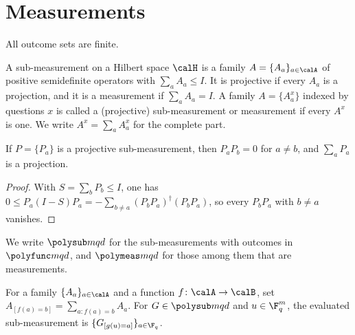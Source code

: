 \section{Measurements}

All outcome sets are finite.

\begin{definition}\label{def:measurements}
	\leanok
	A sub-measurement on a Hilbert space $\calH$ is a family
	$A=\{A_a\}_{a\in\calA}$ of positive semidefinite operators with
	$\sum_aA_a\le I$.  It is projective if every $A_a$ is a projection, and it
	is a measurement if $\sum_aA_a=I$.  A family $A=\{A^x_a\}$ indexed by
	questions $x$ is called a (projective) sub-measurement or measurement if
	every $A^x$ is one.  We write $A^x=\sum_aA^x_a$ for the complete part.
\end{definition}

\begin{proposition}\label{prop:projective-submeasurement-orthogonal}
	\leanok
	If $P=\{P_a\}$ is a projective sub-measurement, then $P_aP_b=0$ for
	$a\ne b$, and $\sum_aP_a$ is a projection.
\end{proposition}
\begin{proof}
	\leanok
	With $S=\sum_bP_b\le I$, one has
	$0\le P_a(I-S)P_a=-\sum_{b\ne a}(P_bP_a)^\dagger(P_bP_a)$, so every
	$P_bP_a$ with $b\ne a$ vanishes.
\end{proof}

\begin{definition}\label{def:polymeasurements}
	We write $\polysub mqd$ for the sub-measurements with outcomes in
	$\polyfunc mqd$, and $\polymeas mqd$ for those among them that are
	measurements.
\end{definition}

\begin{definition}\label{def:post-processing}
	\leanok
	For a family $\{A_a\}_{a\in\calA}$ and a function $f\colon\calA\to\calB$,
	set $A_{[f(a)=b]}=\sum_{a:f(a)=b}A_a$.  For $G\in\polysub mqd$ and
	$u\in\F_q^m$, the evaluated sub-measurement is
	$\{G_{[g(u)=a]}\}_{a\in\F_q}$.
\end{definition}

